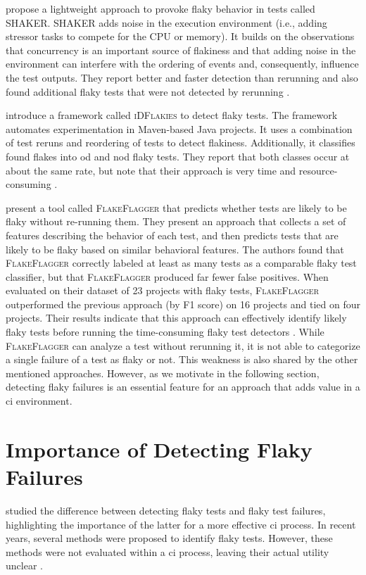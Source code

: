  propose a lightweight approach to provoke flaky behavior in tests called \textsc{SHAKER}.
\textsc{SHAKER} adds noise in the execution environment (i.e., adding stressor tasks to compete for the CPU or memory).
It builds on the observations that concurrency is an important source of flakiness and that adding noise in the environment can interfere with the ordering of events and, consequently, influence the test outputs.
They report better and faster detection than rerunning and also found additional flaky tests that were not detected by rerunning \autocite{silva_shake_2020}.

 introduce a framework called \textsc{iDFlakies} to detect flaky tests.
The framework automates experimentation in Maven-based Java projects.
It uses a combination of test reruns and reordering of tests to detect flakiness.
Additionally, it classifies found flakes into \ac{od} and \ac{nod} flaky tests.
They report that both classes occur at about the same rate, but note that their approach is very time and resource-consuming \autocite{lam_idflakies_2019}.

 present a tool called \textsc{FlakeFlagger} that predicts whether tests are likely to be flaky without re-running them.
They present an approach that collects a set of features describing the behavior of each test, and then predicts tests that are likely to be flaky based on similar behavioral features.
The authors found that \textsc{FlakeFlagger} correctly labeled at least as many tests as a comparable flaky test classifier, but that \textsc{FlakeFlagger} produced far fewer false positives.
When evaluated on their dataset of 23 projects with flaky tests, \textsc{FlakeFlagger} outperformed the previous approach (by F1 score) on 16 projects and tied on four projects.
Their results indicate that this approach can effectively identify likely flaky tests before running the time-consuming flaky test detectors \autocite{alshammari_flakeflagger_2021}.
While \textsc{FlakeFlagger} can analyze a test without rerunning it, it is not able to categorize a single failure of a test as flaky or not.
This weakness is also shared by the other mentioned approaches.
However, as we motivate in the following section, detecting flaky failures is an essential feature for an approach that adds value in a \ac{ci} environment.

\section{Importance of Detecting Flaky Failures}
 studied the difference between detecting flaky tests and flaky test failures, highlighting the importance of the latter for a more effective \ac{ci} process.
In recent years, several methods were proposed to identify flaky tests.
However, these methods were not evaluated within a \ac{ci} process, leaving their actual utility unclear \autocite{haben_importance_2023}.

